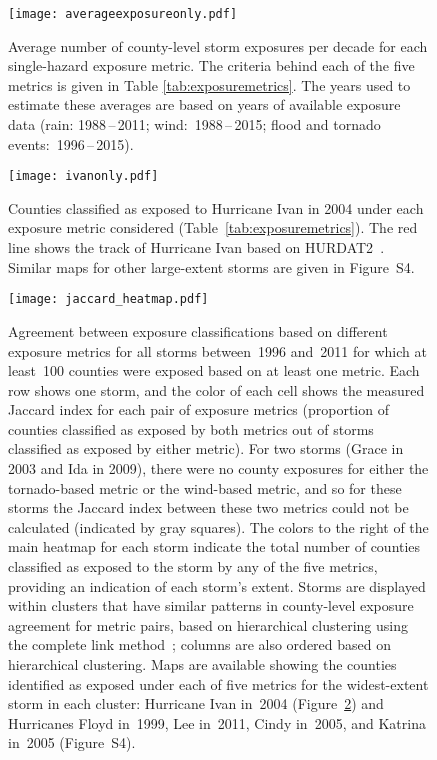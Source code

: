 \clearpage

\begin{figure}%
\centering
\texttt{[image: averageexposureonly.pdf]} 
\caption{Average number of county-level storm exposures per decade for each
	single-hazard exposure metric. The criteria behind each of the five
	metrics is given in Table \ref{tab:exposuremetrics}. The years used to
	estimate these averages are based on years of available exposure data
	(rain: 1988\,--\,2011; wind:~1988\,--\,2015; flood and
	tornado events:~1996\,--\,2015). } 
\label{fig:averageexposure} 
\end{figure}

\clearpage

\begin{figure}%
\centering
\texttt{[image: ivanonly.pdf]}
\caption{Counties classified as exposed to Hurricane Ivan in 2004 under each
	exposure metric considered (Table~\ref{tab:exposuremetrics}). The red
	line shows the track of Hurricane Ivan based on
	\ac{HURDAT2}~\parencite{landsea2013}.  Similar maps for other
	large-extent storms are given in Figure~S4.
	}
\label{fig:ivanexposure} 
\end{figure}

\clearpage

\begin{figure}%
	\centering 
	\texttt{[image: jaccard\_heatmap.pdf]}
	\caption{Agreement between exposure
	classifications based on different exposure metrics for all storms
	between~1996 and~2011 for which at least~100 counties were exposed
	based on at least one metric.  Each row shows one storm, and the color
	of each cell shows the measured Jaccard index for each pair of exposure
	metrics (proportion of counties classified as exposed by both metrics
	out of storms classified as exposed by either metric). For two storms
	(Grace in 2003 and Ida in 2009), there were no county exposures for
	either the tornado-based metric or the wind-based metric, and so for
	these storms the Jaccard index between these two metrics could not be
	calculated (indicated by gray squares). The colors to the right of the
	main heatmap for each storm indicate the total number of counties
	classified as exposed to the storm by any of the five metrics,
	providing an indication of each storm's extent. Storms are displayed
	within clusters that have similar patterns in county-level exposure
	agreement for metric pairs, based on hierarchical clustering using the
	complete link method~\parencite{murtagh2012algorithms}; columns are
	also ordered based on hierarchical clustering. Maps are available
	showing the counties identified as exposed under each of five metrics
	for the widest-extent storm in each cluster: Hurricane Ivan in~2004
	(Figure~\ref{fig:ivanexposure}) and Hurricanes Floyd in~1999, Lee
	in~2011, Cindy in~2005, and Katrina in~2005 (Figure~S4).  }
\label{fig:jaccard} 
\end{figure}


